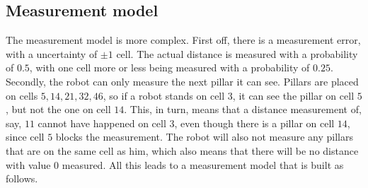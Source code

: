 \documentclass[11pt]{article}
\begin{document}
    \subsection{Measurement model}\label{subsec:measurem}
    The measurement model is more complex.
    First off, there is a measurement error, with a uncertainty of $\pm 1$ cell.
    The actual distance is measured with a probability of $0.5$, with one cell more or less being measured with a probability of $0.25$.
    Secondly, the robot can only measure the next pillar it can see.
    Pillars are placed on cells $5, 14, 21, 32, 46$, so if a robot stands on cell $3$, it can see the pillar on cell $5$, but not the one on cell $14$.
    This, in turn, means that a distance measurement of, say, $11$ cannot have happened on cell $3$, even though there is a pillar on cell $14$, since cell $5$ blocks the measurement.
    The robot will also not measure any pillars that are on the same cell as him, which also means that there will be no distance with value $0$ measured.\newline
    All this leads to a measurement model that is built as follows.
\end{document}
